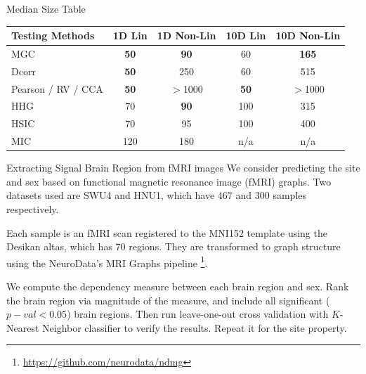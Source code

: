 \documentclass[mathserif,t]{beamer}
\newcommand{\Mgc}{MGC}
\begin{document}
\begin{frame}{Median Size Table}
\begin{tabular}{|l||c|c|c|c|}
\hline
Testing Methods & 1D Lin & 1D Non-Lin & 10D Lin & 10D Non-Lin   \\
\hline
 \textcolor{UniOrange}{MGC}  & \textbf{50}  & \textbf{90} & 60 & \textbf{165} \\
\hline 
 Dcorr & \textbf{50}  & 250 & 60 & 515 \\
\hline
Pearson / RV / CCA & \textbf{50}  & $>$1000 & \textbf{50} & $>$1000 \\
\hline
 HHG & 70  & \textbf{90} & 100 & 315  \\
\hline
HSIC & 70  & 95 & 100 & 400 \\
\hline
MIC & 120  & 180 & n/a & n/a \\
\hline
\end{tabular}
\end{frame}

\begin{frame}{Extracting Signal Brain Region from fMRI images}
\pause
We consider predicting the site and sex based on functional magnetic resonance image (fMRI) graphs. Two datasets used are SWU4 and HNU1, which have $467$ and $300$ samples respectively. \\
\medskip

Each sample is an fMRI scan registered to the MNI152 template using the Desikan altas, which has $70$ regions. They are transformed to graph structure using the NeuroData’s MRI Graphs pipeline \footnote{\url{https://github.com/neurodata/ndmg}}.
\medskip

We compute the dependency measure between each brain region and sex. Rank the brain region via magnitude of the measure, and include all significant ($p-val<0.05$) brain regions. Then run leave-one-out cross validation with $K$-Nearest Neighbor classifier to verify the results. Repeat it for the site property.

\end{frame}
\end{document}

